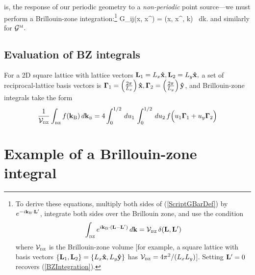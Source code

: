 \documentclass[letterpaper]{article}
\newcommand{\vbGamma}{\boldsymbol{\Gamma}}
\begin{document}
is, the response of our periodic geometry to a \textit{non-periodic}
point source---we must perform a Brillouin-zone 
integration:\footnote{To derive these equations, multiply both sides
of (\ref{ScriptGBarDef}) by $e^{-i\mathbf{k}_{\hbox{\tiny{B}}} \cdot \mathbf{L}^\prime}$,
integrate both sides over the Brillouin zone, and use the
condition 
$$\int_{\hbox{\tiny{BZ}}} e^{i\mathbf{k}_{\hbox{\tiny{B}}}\cdot (\mathbf{L}-\mathbf{L}^\prime)}\,d\mathbf{k}
  =\mathcal{V}_{\hbox{\tiny{BZ}}} \, \delta(\mathbf{L},\mathbf{L}^\prime)
$$
where $\mathcal{V}_{\hbox{\tiny{BZ}}}$ is the Brillouin-zone volume [for example,
a square lattice with basis vectors
$\{\mathbf{L}_1, \mathbf{L}_2\}=\{L_x\mathbf{\hat x}, L_y\mathbf{\hat y}\}$ has
$\mathcal{V}_{\hbox{\tiny{BZ}}}=4\pi^2/(L_x L_y)$].
Setting $\mathbf{L}^\prime=0$ recovers (\ref{BZIntegration}).}
{
  \mc G_{ij}(\vb x, \vb x^\prime)
 = 
   \int{} 
   (\vb x, \vb x^\prime, \vb k)
   \, d\vb k.
}
and similarly for $\mathcal{G}^{\hbox{\tiny{M}}}.$

\subsection*{Evaluation of BZ integrals}

For a 2D square lattice with lattice vectors 
$\mathbf{L}_1=L_x\mathbf{\hat x}, \mathbf{L}_2=L_y\mathbf{\hat x},$
a set of reciprocal-lattice basis vectors is 
$\vbGamma_1=\pf{2\pi}{L_x} \vbhat{x},
 \vbGamma_2=\pf{2\pi}{L_y} \vbhat{y}$,
and Brillouin-zone integrals take the form
$$ \frac{1}{\mc V\subt{BZ}} 
   \int\subt{BZ} f(\vb k\subs{B}) \, d \vb k\subt{B}
  =4\int_0^{1/2} \, d u_1 \, \int_0^{1/2} \, d u_2 \, 
   f\Big( u_1\vbGamma_1 + u_y\vbGamma_2 \Big)
$$

\newpage
\section{Example of a Brillouin-zone integral}
\end{document}
